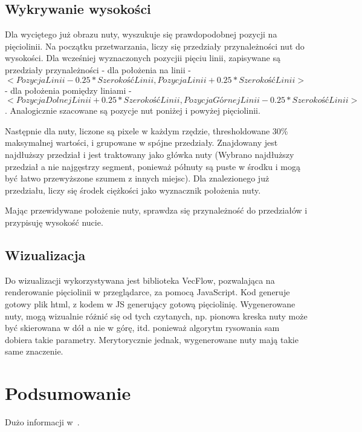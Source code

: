 \documentclass[a4paper,11pt]{article}
\begin{document}
\subsection{Wykrywanie wysokości}
Dla wyciętego już obrazu nuty, wyszukuje się prawdopodobnej pozycji na pięciolinii.
Na początku przetwarzania, liczy się przedziały przynależności nut do wysokości.
Dla wcześniej wyznaczonych pozycjii pięciu linii, zapisywane są przedziały przynależności - dla położenia na linii -
$<PozycjaLinii - 0.25 * SzerokośćLinii, PozycjaLinii + 0.25 * SzerokośćLinii>$ - dla położenia pomiędzy liniami -
$<PozycjaDolnejLinii + 0.25 * SzerokośćLinii, PozycjaGórnejLinii - 0.25 * SzerokośćLinii>$.
Analogicznie szacowane są pozycje nut poniżej i powyżej pięciolinii.

Następnie dla nuty, liczone są pixele w każdym rzędzie, thresholdowane 30\% maksymalnej wartości, i grupowane w spójne przedziały.
Znajdowany jest najdłuższy przedział i jest traktowany jako główka nuty
(Wybrano najdłuższy przedział a nie najgęstrzy segment, ponieważ półnuty są puste w środku i mogą być łatwo przewyższone szumem z innych miejsc).
Dla znalezionego już przedziału, liczy się środek ciężkości jako wyznacznik położenia nuty.

Mając przewidywane położenie nuty, sprawdza się przynależność do przedziałów i przypisuję wysokość nucie.

\subsection{Wizualizacja}
Do wizualizacji wykorzystywana jest biblioteka VecFlow, pozwalająca na renderowanie pięciolinii w przeglądarce, za pomocą JavaScript.
Kod generuje gotowy plik html, z kodem w JS generujący gotową pięciolinię.
Wygenerowane nuty, mogą wizualnie różnić się od tych czytanych,
np. pionowa kreska nuty może być skierowana w dół a nie w górę, itd. ponieważ algorytm rysowania sam dobiera takie parametry.
Merytorycznie jednak, wygenerowane nuty mają takie same znaczenie.

\section{Podsumowanie}

Dużo informacji w~\cite{10strategies}.



\end{document}
